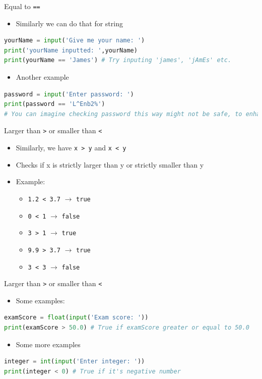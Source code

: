 \documentclass[10pt,xcolor={table,dvipsnames},t]{beamer}
\begin{document}
\begin{frame}[fragile]{Equal to \texttt{==}}
  \begin{itemize}
    \item Similarly we can do that for string
  \end{itemize}
\begin{lstlisting}[language=python]
yourName = input('Give me your name: ')
print('yourName inputted: ',yourName)
print(yourName == 'James') # Try inputing 'james', 'jAmEs' etc.
\end{lstlisting}
\begin{itemize}
  \item Another example
\end{itemize}
\begin{lstlisting}[language=python]
password = input('Enter password: ')
print(password == 'L^Enb2%') 
# You can imagine checking password this way might not be safe, to enhance safty people use hashing
\end{lstlisting}
\end{frame}

\begin{frame}{Larger than \texttt{>} or smaller than \texttt{<}}
  \begin{itemize}
    \item Similarly, we have \texttt{x > y} and \texttt{x < y}
    \item Checks if x is strictly larger than y or strictly smaller than y
    \item Example:
    \begin{itemize}
      \item \texttt{1.2 < 3.7} $\rightarrow$ \texttt{true}
      \item \texttt{0 < 1} $\rightarrow$ \texttt{false}
      \item \texttt{3 > 1} $\rightarrow$ \texttt{true}
      \item \texttt{9.9 > 3.7} $\rightarrow$ \texttt{true}
      \item \texttt{3 < 3} $\rightarrow$ \texttt{false} 
    \end{itemize}
  \end{itemize}
\end{frame}

\begin{frame}[fragile]{Larger than \texttt{>} or smaller than \texttt{<}}
  \begin{itemize}
    \item Some examples:
  \end{itemize}
\begin{lstlisting}[language=python]
examScore = float(input('Exam score: '))
print(examScore > 50.0) # True if examScore greater or equal to 50.0
\end{lstlisting}
\begin{itemize}
  \item Some more examples
\end{itemize}
\begin{lstlisting}[language=python]
integer = int(input('Enter integer: '))
print(integer < 0) # True if it's negative number
\end{lstlisting}
\end{frame}
\end{document}
